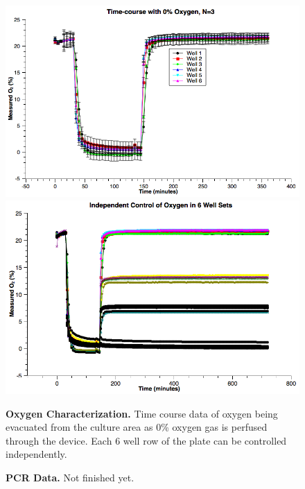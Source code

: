 \documentclass[]{article}
\begin{document}
\begin{figure}[H]
\includegraphics[scale=0.3]{../presentation-figures/6-well-plot.png} %
\includegraphics[scale=0.3]{../presentation-figures/24-well-plot.png} %
\caption{
{\bf Oxygen Characterization.}  Time course data of oxygen being evacuated from the culture area as 0\% oxygen gas is perfused through the device. Each 6 well row of the plate can be controlled independently.  
}
\label{oxygen-char-figure}
\end{figure}

\begin{figure}[H]
\caption{
{\bf PCR Data.}  Not finished yet.  
}
\label{pcr-data}
\end{figure}



\end{document}
